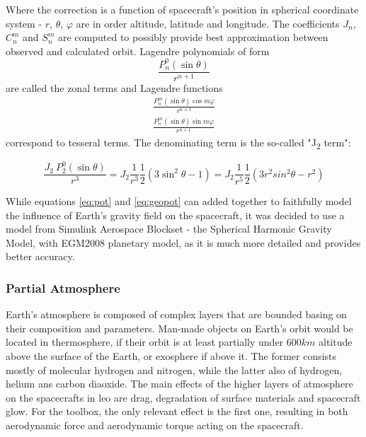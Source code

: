         Where the correction is a function of spacecraft's position in spherical coordinate system - $r$, $\theta$, $\varphi$ are in order altitude, latitude and longitude. The coefficients $J_n$, $C_n^m$ and $S_n^m$ are computed to possibly provide best approximation between observed and calculated orbit. Lagendre polynomials of form 
        \begin{equation}
            \frac{P^0_n(\sin\theta) }{r^{n+1}}    
        \end{equation}
        are called the zonal terms and Lagendre functions 
        \begin{equation}
        \begin{aligned}
            \frac{ P^m_n(\sin\theta) \cos m\varphi}{r^{n+1}}\\
            \frac{ P^m_n(\sin\theta) \sin m\varphi}{r^{n+1}}
        \end{aligned}
        \end{equation}
        correspond to tesseral terms. The denominating term is the so-called "J\textsubscript{2} term":

        \begin{equation}
            \frac{J_2\ P^0_2(\sin\theta)}{r^3} = J_2 \frac{1}{r^3} \frac{1}{2} (3\sin^2\theta -1) = J_2 \frac{1}{r^5} \frac{1}{2} (3 r^2sin^2\theta -r^2)
        \end{equation}

        While equations \eqref{eq:pot} and \eqref{eq:geopot} can added together to faithfully model the influence of Earth's gravity field on the spacecraft, it was decided to use a model from Simulink Aerospace Blockset - the Spherical Harmonic Gravity Model, with EGM2008 planetary model, as it is much more detailed and provides better accuracy.


    \subsubsection{Partial Atmosphere}\label{toolbox:atmosphere}
        Earth's atmosphere is composed of complex layers that are bounded basing on their composition and parameters. Man-made objects on Earth's orbit would be located in thermosphere, if their orbit is at least partially under $600km$ altitude above the surface of the Earth, or exosphere if above it. The former consists mostly of molecular hydrogen and nitrogen, while the latter also of hydrogen, helium ans carbon diaoxide. The main effects of the higher layers of atmosphere on the spacecrafts in \ac{leo} are drag, degradation of surface materials and spacecraft glow. For the toolbox, the only relevant effect is the first one, resulting in both aerodynamic force and aerodynamic torque acting on the spacecraft.

